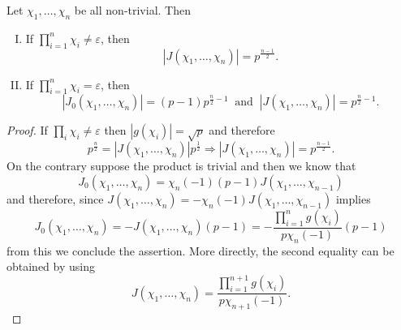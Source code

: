 \begin{theorem}
   Let \(\chi_1, \dots, \chi_n\) be all non-trivial. Then
   \begin{enumerate}[I.]
      \item If \(\prod_{i=1}^n \chi_i \neq  \varepsilon\), then
         \[
            |J(\chi_1, \dots, \chi_n)| = p^{\frac{n-1}{2}}.
         \] 
      \item If \(\prod_{i=1}^n \chi_i = \varepsilon\), then
         \[
            |J_0(\chi_1, \dots, \chi_n)| = (p-1)p^{\frac{n}{2} - 1}\ \text{ and
            }\ |J(\chi_1,\dots, \chi_n)| = p^{\frac{n}{2} - 1}.
         \] 
   \end{enumerate}
\end{theorem}

\begin{proof}
   If \(\prod_i \chi_i \neq  \varepsilon\) then \(|g(\chi_i)| = \sqrt{p}  \) and
   therefore 
   \[
      p^{\frac{n}{2}} = |J(\chi_1, \dots, \chi_n)| p^{\frac{1}{2}} 
      \Rightarrow  |J(\chi_1, \dots, \chi_n)| = p^{\frac{n-1}{2}}.
   \] 
   On the contrary suppose the product is trivial and then we know that
   \[
      J_0(\chi_1,\dots,\chi_n) = \chi_n(-1) (p-1) J(\chi_1, \dots, \chi_{n-1})
   \] 
   and therefore, since \(J(\chi_1, \dots, \chi_n) = -\chi_n(-1)
   J(\chi_1,\dots,\chi_{n-1})\) implies
    \[
       J_0(\chi_1,\dots, \chi_n) = - J(\chi_1, \dots, \chi_n) (p-1) = -
       \frac{\prod_{i=1}^{n}g(\chi_i)}{p \chi_n(-1)} (p-1)
   \] 
   from this we conclude the assertion. More directly, the second equality can
   be obtained by using
   \[
      J(\chi_1,\dots,\chi_n) = \frac{\prod_{i=1}^{n+1}
      g(\chi_i)}{p\chi_{n+1}(-1)}.
   \] 
\end{proof}

